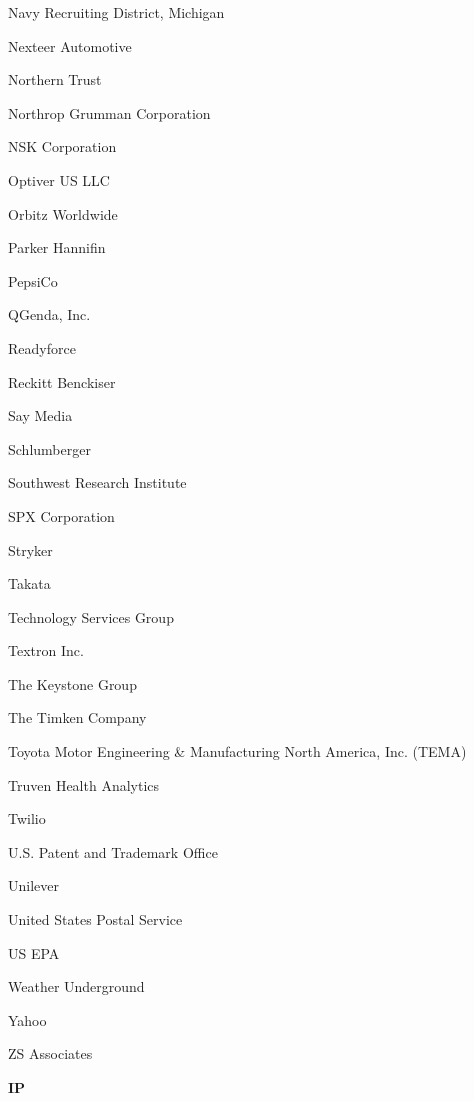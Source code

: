 \documentclass[twoside]{article}
\begin{document}
\begin{center}
\begin{multicols}{5}
\begin{FlushLeft}
\begin{compactitem}
\item Navy Recruiting District, Michigan
\item Nexteer Automotive
\item Northern Trust
\item Northrop Grumman Corporation
\item NSK Corporation
\item Optiver US LLC
\item Orbitz Worldwide
\item Parker Hannifin
\item PepsiCo
\item QGenda, Inc.
\item Readyforce
\item Reckitt Benckiser
\item Say Media
\item Schlumberger
\item Southwest Research Institute
\item SPX Corporation
\item Stryker
\item Takata
\item Technology Services Group
\item Textron Inc.
\item The Keystone Group
\item The Timken Company
\item Toyota Motor Engineering \& Manufacturing North America, Inc. (TEMA)
\item Truven Health Analytics
\item Twilio
\item U.S. Patent and Trademark Office
\item Unilever
\item United States Postal Service
\item US EPA
\item Weather Underground
\item Yahoo
\item ZS Associates
\end{compactitem}
        \end{FlushLeft}
        \vspace{1em}
        {\fontsize{14}{16}\selectfont \bf IP}\\
        \vspace{-1em}
        ~\hrulefill~
        \vspace{-.9em}
        \begin{FlushLeft}
        \begin{compactitem}

\end{compactitem}
\end{FlushLeft}
\end{multicols}
\end{center}
\end{document}
